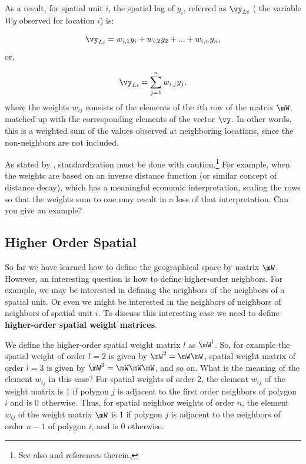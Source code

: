 As a result, for spatial unit $i$, the spatial lag of $y_i$, referred as $\vy_{Li}$ ( the variable $Wy$ observed for location $i$) is:

\begin{equation*}
  \vy_{Li} = w_{i, 1}y_i + w_{i, 2}y_2 + ... + w_{i, n}y_n, 
\end{equation*}
%
or,

\begin{equation*}
  \vy_{Li} = \sum_{j = 1}^nw_{i,j}y_j,
\end{equation*}
%
where the weights $w_{ij}$ consists of the elements of the $i$th row of the matrix $\mW$, matched up with the corresponding elements of the vector $\vy$. In other words, this is a weighted sum of the values observed at neighboring locations, since the non-neighbors are not included. 

\begin{remark}
As stated by \citet[][p. 23-24]{anselin1988spatial}, standardization must be done with caution.\footnote{See also \citet[][p. 12]{elhorst2014spatial} and references therein.} For example, when the weights are based on an inverse distance function (or similar concept of distance decay), which has a meaningful economic interpretation, scaling the rows so that the weights sum to one may result in a loss of that interpretation. Can you give an example?
\end{remark}


\subsection{Higher Order Spatial}\label{sec:HSO}

So far we have learned how to define the geographical space by matrix $\mW$. However, an interesting question is how to define higher-order neighbors. For example, we may be interested in defining the neighbors of the neighbors of a spatial unit. Or even we might be interested in the neighbors of neighbors of neighbors of spatial unit $i$. To discuss this interesting case we need to define \textbf{higher-order spatial weight matrices}. 

We define the higher-order spatial weight matrix $l$ as $\mW^l$. So, for example the spatial weight of order $l=2$ is given by $\mW^2 = \mW\mW$, spatial weight matrix of order $l = 3$ is given by $\mW^3 = \mW\mW\mW$, and so on. What is the meaning of the element $w_{ij}$ in this case? For spatial weights of order 2, the element $w_{ij}$ of the weight matrix is 1 if polygon $j$ is adjacent to the first order neighbors of polygon $i$ and is 0 otherwise. Thus, for spatial neighbor weights of order $n$, the element $w_{ij}$ of the weight matrix $\mW$ is 1 if polygon $j$ is adjacent to the neighbors of order $n-1$ of polygon $i$, and is 0 otherwise. 

